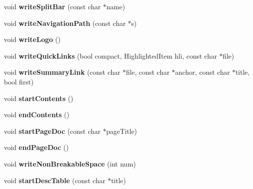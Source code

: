\begin{DoxyCompactItemize}
void {\bfseries write\+Split\+Bar} (const char $\ast$name)
\item 
\mbox{\label{class_output_list_a18eb7bb7378c700327a1a4a9c2606ec5}} 
void {\bfseries write\+Navigation\+Path} (const char $\ast$s)
\item 
\mbox{\label{class_output_list_a739eb036549fb3787e5daa3d35bc1aff}} 
void {\bfseries write\+Logo} ()
\item 
\mbox{\label{class_output_list_a6e54b85927d53ba0168ef08a3bd748fd}} 
void {\bfseries write\+Quick\+Links} (bool compact, Highlighted\+Item hli, const char $\ast$file)
\item 
\mbox{\label{class_output_list_a53d9546827d8cd1137b6ff3ec7db1984}} 
void {\bfseries write\+Summary\+Link} (const char $\ast$file, const char $\ast$anchor, const char $\ast$title, bool first)
\item 
\mbox{\label{class_output_list_ac891ad4a7081e1ab9d42a637596111db}} 
void {\bfseries start\+Contents} ()
\item 
\mbox{\label{class_output_list_a317bae5a753eac709cf776b2ec2fb732}} 
void {\bfseries end\+Contents} ()
\item 
\mbox{\label{class_output_list_ae559218fdb96f1bdb294e0a62cd3011c}} 
void {\bfseries start\+Page\+Doc} (const char $\ast$page\+Title)
\item 
\mbox{\label{class_output_list_a58cd93dd010aa638e8b54259bdea9b74}} 
void {\bfseries end\+Page\+Doc} ()
\item 
\mbox{\label{class_output_list_ae6cc078977edd1e2a5ae2cf6ed64ed35}} 
void {\bfseries write\+Non\+Breakable\+Space} (int num)
\item 
\mbox{\label{class_output_list_afbb3ffe228e3d50508ee7161194344fc}} 
void {\bfseries start\+Desc\+Table} (const char $\ast$title)
\item 
\mbox{\label{class_output_list_a223fb4453aeeaf8270e8bd5f875ed9c9}} 

\end{DoxyCompactItemize}
